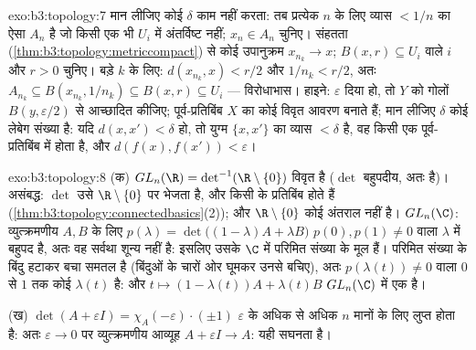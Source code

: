 \begin{solution}{exo:b3:topology:7}
मान लीजिए कोई $\delta$ काम नहीं करता: तब प्रत्येक $n$ के लिए व्यास
$< 1/n$ का ऐसा $A_n$ है जो किसी एक भी $U_i$ में अंतर्विष्ट नहीं; $x_n \in
A_n$
चुनिए। संहतता (\cref{thm:b3:topology:metriccompact}) से कोई उपानुक्रम $x_{n_k} \to x$; $B(x,
r) \subseteq U_i$ वाले $i$ और
$r > 0$ चुनिए। बड़े $k$ के लिए: $d(x_{n_k}, x) < r/2$ और $1/n_k < r/2$, अतः $A_{n_k} \subseteq B(x_{n_k}, 1/n_k)
\subseteq B(x, r) \subseteq U_i$ ---
विरोधाभास। हाइने: $\varepsilon$ दिया हो, तो $Y$ को गोलों $B(y, \varepsilon/2)$ से आच्छादित
कीजिए; पूर्व-प्रतिबिंब $X$ का कोई विवृत आवरण बनाते हैं; मान लीजिए
$\delta$ कोई लेबेग संख्या है: यदि $d(x, x') < \delta$ हो, तो युग्म $\{x, x'\}$ का व्यास
$< \delta$ है, वह किसी एक पूर्व-प्रतिबिंब में होता है, और $d(f(x),
f(x')) < \varepsilon$।
\end{solution}

\begin{solution}{exo:b3:topology:8}
(क) $GL_n(\R) = \det^{-1}(\R\setminus\{0\})$ विवृत है ($\det$ बहुपदीय, अतः  है)। असंबद्ध: $\det$ उसे
$\R\setminus\{0\}$ पर भेजता है, और किसी  के  प्रतिबिंब 
होते हैं (\cref{thm:b3:topology:connectedbasics}(2)); और $\R\setminus\{0\}$ कोई अंतराल नहीं है। $GL_n(\C)$: व्युत्क्रमणीय
$A, B$ के लिए $p(\lambda) = \det\bigl((1-\lambda)A + \lambda
B\bigr)$ $p(0), p(1) \neq 0$ वाला $\lambda$ में बहुपद है, अतः वह सर्वथा शून्य
नहीं है: इसलिए उसके $\C$ में परिमित संख्या के मूल हैं। परिमित संख्या
के बिंदु हटाकर बचा समतल  है (बिंदुओं के चारों ओर घूमकर उनसे
बचिए), अतः $p(\lambda(t)) \neq 0$ वाला $0$ से $1$ तक कोई  $\lambda(t)$ है: और $t \mapsto
(1-\lambda(t))A + \lambda(t)B$
$GL_n(\C)$ में एक  है।

(ख) $\det(A + \varepsilon I) = \chi_A(-\varepsilon)\cdot(\pm1)$ $\varepsilon$ के अधिक से अधिक $n$ मानों के लिए लुप्त होता है:
अतः $\varepsilon \to 0$ पर व्युत्क्रमणीय आव्यूह $A + \varepsilon I \to A$: यही सघनता है।
\end{solution}

